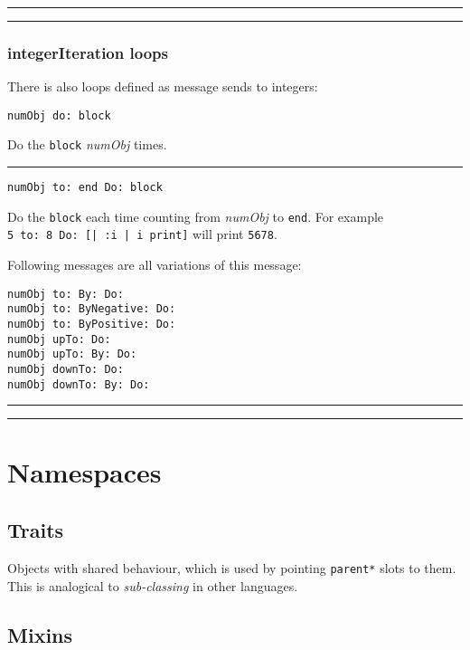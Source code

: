 \documentclass[10pt]{article}
\begin{document}
\begin{multicols*}{3}
\vspace{0.2cm}
\hrule
\vspace{0.03cm}
\hrule

\subsubsection{integerIteration loops}

There is also loops defined as message sends to integers:

\begin{lstlisting}
numObj do: block
\end{lstlisting}

Do the \texttt{block} \textit{numObj} times.

\vspace*{0.2cm}
\hrule

\begin{lstlisting}
numObj to: end Do: block
\end{lstlisting}

Do the \texttt{block} each time counting from \textit{numObj} to \texttt{end}. For example \texttt{5\ to:\ 8\ Do:\ [|\ :i\ |\ i\ print]} will print \texttt{5678}.

Following messages are all variations of this message:

\begin{lstlisting}
numObj to: By: Do:
numObj to: ByNegative: Do:
numObj to: ByPositive: Do:
numObj upTo: Do:
numObj upTo: By: Do:
numObj downTo: Do:
numObj downTo: By: Do:
\end{lstlisting}

\vspace*{0.2cm}
\hrule
\vspace*{0.03cm}
\hrule




\section{Namespaces}

\subsection{Traits}
Objects with shared behaviour, which is used by pointing \texttt{parent*} slots to them. This is analogical to \textit{sub-classing} in other languages.



\subsection{Mixins}


\end{multicols*}
\end{document}
